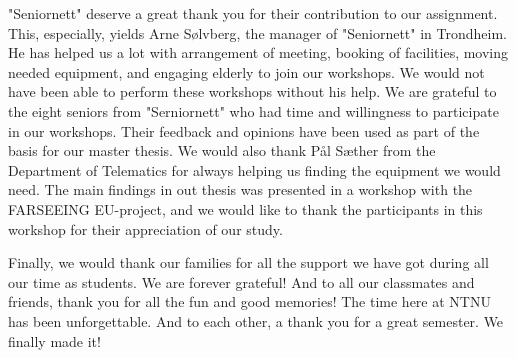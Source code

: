 \documentclass[b5paper,twoside,openright,11pt]{report}
\begin{document}
"Seniornett" deserve a great thank you for their contribution to our assignment. This, especially, yields Arne Sølvberg, the manager of "Seniornett" in Trondheim. He has helped us a lot with arrangement of meeting, booking of facilities, moving needed equipment, and engaging elderly to join our workshops. We would not have been able to perform these workshops without his help. We are grateful to the eight seniors from "Serniornett" who had time and willingness to participate in our workshops. Their feedback and opinions have been used as part of the basis for our master thesis. We would also thank Pål Sæther from the Department of Telematics for always helping us finding the equipment we would need. The main findings in out thesis was presented in a workshop with the FARSEEING EU-project, and we would like to thank the participants in this workshop for their appreciation of our study. 

Finally, we would thank our families for all the support we have got during all our time as students. We are forever grateful! And to all our classmates and friends, thank you for all the fun and good memories! The time here at NTNU has been unforgettable. And to each other, a thank you for a great semester. We finally made it!   

\cleardoublepage
{}
\tableofcontents
\cleardoublepage

\cleardoublepage
\listoffigures
\cleardoublepage
\listoftables
\cleardoublepage
{}
\pagestyle{fancy}
\fancyhead[LE]{\thepage}
\fancyhead[RE]{\leftmark}
\fancyhead[RO]{\thepage}
\fancyhead[LO]{\rightmark}
\fancyfoot{}
\cleardoublepage

\cleardoublepage

\cleardoublepage

\cleardoublepage

\cleardoublepage

\cleardoublepage

\cleardoublepage

\cleardoublepage

\cleardoublepage

\cleardoublepage

\cleardoublepage

\cleardoublepage

\cleardoublepage

\cleardoublepage


\pagestyle{plain}
\cleardoublepage
\appendix 
  
\cleardoublepage
\end{document}
